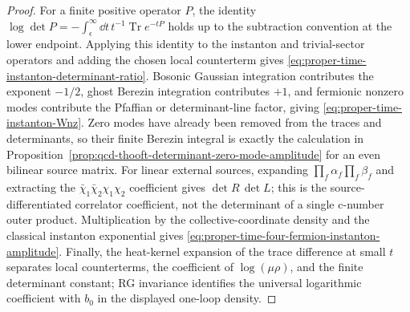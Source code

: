 \begin{proof}
For a finite positive operator \(P\), the identity
\(\log\det P=-\int_{\epsilon}^{\infty}\dd t\,t^{-1}\operatorname{Tr}e^{-tP}\)
holds up to the subtraction convention at the lower endpoint.  Applying this
identity to the instanton and trivial-sector operators and adding the chosen
local counterterm gives
\eqref{eq:proper-time-instanton-determinant-ratio}.  Bosonic Gaussian
integration contributes the exponent \(-1/2\), ghost Berezin integration
contributes \(+1\), and fermionic nonzero modes contribute the Pfaffian or
determinant-line factor, giving
\eqref{eq:proper-time-instanton-Wnz}.  Zero modes have already been removed
from the traces and determinants, so their finite Berezin integral is exactly
the calculation in
Proposition~\ref{prop:qcd-thooft-determinant-zero-mode-amplitude} for an even
bilinear source matrix.  For linear external sources, expanding
\(\prod_f\alpha_f\prod_f\beta_f\) and extracting the
\(\bar\chi_1\bar\chi_2\chi_1\chi_2\) coefficient gives
\(\det R\,\det L\); this is the source-differentiated correlator coefficient,
not the determinant of a single c-number outer product.  Multiplication by the
collective-coordinate density and the classical instanton exponential gives
\eqref{eq:proper-time-four-fermion-instanton-amplitude}.  Finally, the
heat-kernel expansion of the trace difference at small \(t\) separates local
counterterms, the coefficient of \(\log(\mu\rho)\), and the finite
determinant constant; RG invariance identifies the universal logarithmic
coefficient with \(b_0\) in the displayed one-loop density.
\end{proof}

